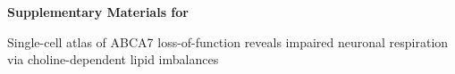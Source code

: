 \begin{titlepage}
    \centering
    {\Large \bfseries Supplementary Materials for\par}
    \vspace{1em}
    {\large Single-cell atlas of ABCA7 loss-of-function reveals impaired neuronal respiration via choline-dependent lipid imbalances\par}
    \vfill
\end{titlepage}
